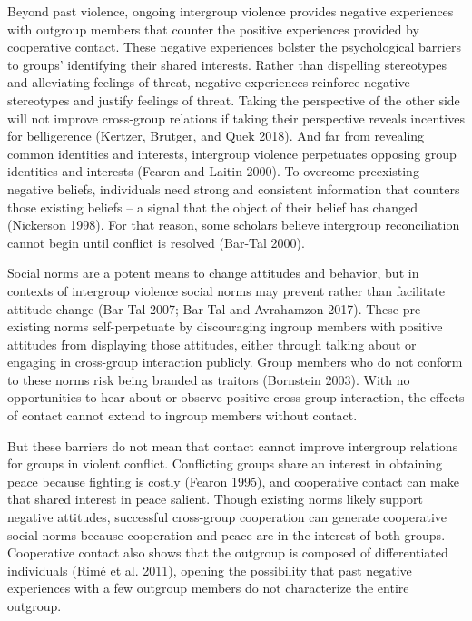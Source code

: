 \documentclass[11pt]{article}
\begin{document}
Beyond past violence, ongoing intergroup violence provides negative
experiences with outgroup members that counter the positive experiences
provided by cooperative contact. These negative experiences bolster the
psychological barriers to groups' identifying their shared interests.
Rather than dispelling stereotypes and alleviating feelings of threat,
negative experiences reinforce negative stereotypes and justify feelings
of threat. Taking the perspective of the other side will not improve
cross-group relations if taking their perspective reveals incentives for
belligerence (Kertzer, Brutger, and Quek 2018). And far from revealing
common identities and interests, intergroup violence perpetuates
opposing group identities and interests (Fearon and Laitin 2000). To
overcome preexisting negative beliefs, individuals need strong and
consistent information that counters those existing beliefs -- a signal
that the object of their belief has changed (Nickerson 1998). For that
reason, some scholars believe intergroup reconciliation cannot begin
until conflict is resolved (Bar-Tal 2000).

Social norms are a potent means to change attitudes and behavior, but in
contexts of intergroup violence social norms may prevent rather than
facilitate attitude change (Bar-Tal 2007; Bar-Tal and Avrahamzon 2017).
These pre-existing norms self-perpetuate by discouraging ingroup members
with positive attitudes from displaying those attitudes, either through
talking about or engaging in cross-group interaction publicly. Group
members who do not conform to these norms risk being branded as traitors
(Bornstein 2003). With no opportunities to hear about or observe
positive cross-group interaction, the effects of contact cannot extend
to ingroup members without contact.

But these barriers do not mean that contact cannot improve intergroup
relations for groups in violent conflict. Conflicting groups share an
interest in obtaining peace because fighting is costly (Fearon 1995),
and cooperative contact can make that shared interest in peace salient.
Though existing norms likely support negative attitudes, successful
cross-group cooperation can generate cooperative social norms because
cooperation and peace are in the interest of both groups. Cooperative
contact also shows that the outgroup is composed of differentiated
individuals (Rimé et al. 2011), opening the possibility that past
negative experiences with a few outgroup members do not characterize the
entire outgroup.
\end{document}
